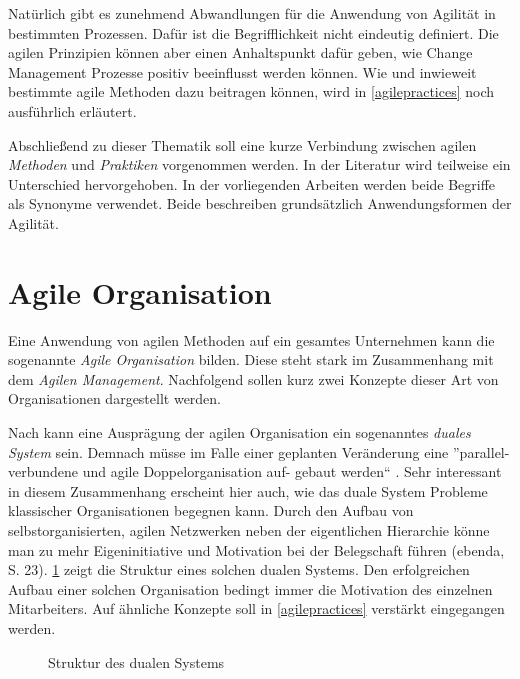 
Natürlich gibt es zunehmend Abwandlungen für die Anwendung von Agilität in bestimmten Prozessen. Dafür ist die Begrifflichkeit nicht eindeutig definiert. Die agilen Prinzipien können aber einen Anhaltspunkt dafür geben, wie Change Management Prozesse positiv  beeinflusst werden können. Wie und inwieweit bestimmte agile Methoden dazu beitragen können, wird in \ref{agilepractices} noch ausführlich erläutert.

Abschließend zu dieser Thematik soll eine kurze Verbindung zwischen agilen \textit{Methoden} und \textit{Praktiken} vorgenommen werden. In der Literatur wird teilweise ein Unterschied hervorgehoben. In der vorliegenden Arbeiten werden beide Begriffe als Synonyme verwendet. Beide beschreiben grundsätzlich Anwendungsformen der Agilität.

\section{Agile Organisation}
\label{background:agileorganisation}

Eine Anwendung von agilen Methoden auf ein gesamtes Unternehmen kann die sogenannte \textit{Agile Organisation} bilden. Diese steht stark im Zusammenhang mit  dem \textit{Agilen Management}. Nachfolgend sollen kurz zwei Konzepte dieser Art von Organisationen dargestellt werden.

Nach  kann eine Ausprägung der agilen Organisation ein sogenanntes \textit{duales System} sein. Demnach müsse im Falle einer geplanten Veränderung eine ''parallel-verbundene und agile Doppelorganisation auf- gebaut werden`` \cite[S. 22]{deeken_agiles_2018}. Sehr interessant in diesem Zusammenhang erscheint hier auch, wie das duale System Probleme klassischer Organisationen begegnen kann. Durch den Aufbau von selbstorganisierten, agilen Netzwerken neben der eigentlichen Hierarchie könne man zu mehr Eigeninitiative und Motivation bei der Belegschaft  führen (ebenda, S. 23). \ref{fig:dualessystem} zeigt die Struktur eines solchen dualen Systems. Den erfolgreichen Aufbau einer solchen Organisation bedingt immer die Motivation des einzelnen Mitarbeiters. Auf ähnliche Konzepte soll in \ref{agilepractices} verstärkt eingegangen werden.  

 \begin{figure}
	\centering
	\caption[Struktur des dualen Systems]{Struktur des dualen Systems \protect \cite[S. 23]{deeken_agiles_2018}}
	\label{fig:dualessystem}
\end{figure}

